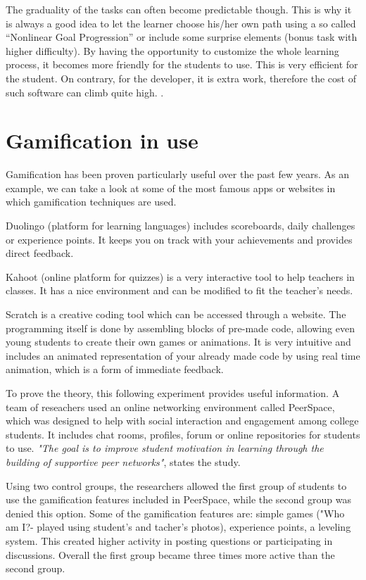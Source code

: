 \documentclass[10pt,english,a4paper]{article}
\begin{document}
	The graduality of the tasks can often become predictable though.
	This is why it is always a good idea to let the learner choose his/her own path using a so called “Nonlinear Goal Progression” or include some surprise elements (bonus task with higher difficulty).
	By having the opportunity to customize the whole learning process, it becomes more friendly for the students to use. 
	This is very efficient for the student. On contrary, for the developer, it is extra work, therefore the cost of such software can climb quite high. \cite{Raymer}.

\section{Gamification in use} \label{section4}
	Gamification has been proven particularly useful over the past few years.
	As an example, we can take a look at some of the most famous apps or websites in which gamification techniques are used.

		 Duolingo (platform for learning languages) includes scoreboards, daily challenges or experience points. 
		 It keeps you on track with your achievements and provides direct feedback. 
		 
		 Kahoot (online platform for quizzes) is a very interactive tool to help teachers in classes. 
		 It has a nice environment and can be modified to fit the teacher's needs.
		 
		 Scratch is a creative coding tool which can be accessed through a website. 
		 The programming itself is done by assembling blocks of pre-made code, allowing even young students to create their own games or animations. 
		 It is very intuitive and includes an animated representation of your already made code by using real time animation, which is a form of immediate feedback.

	To prove the theory, this following experiment provides useful information. 
	A team of reseachers used an online networking environment called PeerSpace, which was designed to help with social interaction and engagement among college students.
	It includes chat rooms, profiles, forum or online repositories for students to use. 
	\textit{"The goal is to improve student motivation in learning through the building of supportive peer networks"}, states the study.
	
	Using two control groups, the researchers allowed the first group of students to use the gamification features included in PeerSpace, while the second group was denied this option.
	Some of the gamification features are: simple games ("Who am I?- played using student's and tacher's photos), experience points, a leveling system. 
	This created higher activity in posting questions or participating in discussions. Overall the first group became three times more active than the second group\cite{Li}. 
	
\end{document}

